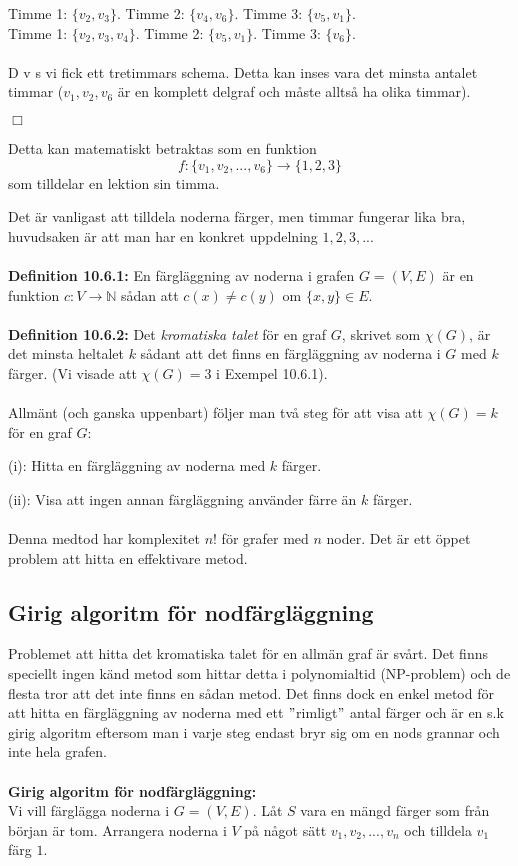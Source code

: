 \documentclass{article}
\begin{document}
Timme 1: $\{v_2,v_3\}$. Timme 2: $\{v_4,v_6\}$. Timme 3: $\{v_5,v_1\}$.\\

Timme 1: $\{v_2,v_3,v_4\}$. Timme 2: $\{v_5,v_1\}$. Timme 3: $\{v_6\}$.\\ \\
D v s vi fick ett tretimmars schema. Detta kan inses vara det minsta antalet timmar ($v_1,v_2,v_6$ är en komplett delgraf och måste alltså ha olika timmar).
\begin{flushright}
$\Box$
\end{flushright}
Detta kan matematiskt betraktas som en funktion
$$
f: \{v_1,v_2,...,v_6\} \longrightarrow \{1,2,3\}
$$
som tilldelar en lektion sin timma.

Det är vanligast att tilldela noderna färger, men timmar fungerar lika bra, huvudsaken är att man har en konkret uppdelning $1,2,3,...$\\ \\
\textbf{Definition 10.6.1:} En färgläggning av noderna i grafen $G=(V,E)$ är en funktion $c:V\longrightarrow\mathbb{N}$ sådan att $c(x)\neq c(y)$ om $\{x,y\}\in E$.\\ \\
\textbf{Definition 10.6.2:} Det \textit{kromatiska talet} för en graf $G$, skrivet som $\chi(G)$, är det minsta heltalet $k$ sådant att det finns en färgläggning av noderna i $G$ med $k$ färger. (Vi visade att $\chi(G)=3$ i Exempel 10.6.1).\\ \\
Allmänt (och ganska uppenbart) följer man två steg för att visa att $\chi(G)=k$ för en graf $G$:

(i): Hitta en färgläggning av noderna med $k$ färger.

(ii): Visa att ingen annan färgläggning använder färre än $k$ färger.\\ \\
Denna medtod har komplexitet $n!$ för grafer med $n$ noder. Det är ett öppet problem att hitta en effektivare metod.

\subsection{Girig algoritm för nodfärgläggning}
Problemet att hitta det kromatiska talet för en allmän graf är svårt. Det finns speciellt ingen känd metod som hittar detta i polynomialtid (NP-problem) och de flesta tror att det inte finns en sådan metod. Det finns dock en enkel metod för att hitta en färgläggning av noderna med ett $"$rimligt$"$ antal färger och är en s.k girig algoritm eftersom man i varje steg endast bryr sig om en nods grannar och inte hela grafen.\\ \\
\textbf{Girig algoritm för nodfärgläggning:}\\
Vi vill färglägga noderna i $G=(V,E)$. Låt $S$ vara en mängd färger som från början är tom. Arrangera noderna i $V$ på något sätt $v_1,v_2,...,v_n$ och tilldela $v_1$ färg $1$. 
\end{document}
